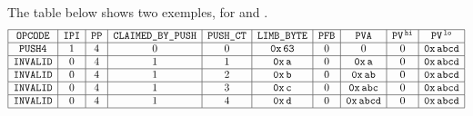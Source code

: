 The table below shows two exemples, for  and .
\[
    \begin{array}{|c|c|c|c|c|c|c|c|c|c|}
        \hline
        \texttt{OPCODE}           & \texttt{IPI}{} & \texttt{PP}{} & \texttt{CLAIMED\_BY\_PUSH}{} & \texttt{PUSH\_CT}{} & \texttt{LIMB\_BYTE}{} & \texttt{PFB}{} & \texttt{PVA}              & \texttt{PV}^{\mathtt{\,hi}}{} & \texttt{PV}^{\mathtt{\,lo}}{}         \\ \hline
        \texttt{PUSH4}   & 1     & 4     & 0      & 0     & \mathtt{0x\,63}      & 0      & 0                 & 0          & \mathtt{0x\,abcd} \\ \hline
        \texttt{INVALID} & 0     & 4     & 1      & 1     & \mathtt{0x\,a}       & 0      & \mathtt{0x\,a}    & 0          & \mathtt{0x\,abcd} \\ \hline
        \texttt{INVALID} & 0     & 4     & 1      & 2     & \mathtt{0x\,b}       & 0      & \mathtt{0x\,ab}   & 0          & \mathtt{0x\,abcd} \\ \hline
        \texttt{INVALID} & 0     & 4     & 1      & 3     & \mathtt{0x\,c}       & 0      & \mathtt{0x\,abc}  & 0          & \mathtt{0x\,abcd} \\ \hline
        \texttt{INVALID} & 0     & 4     & 1      & 4     & \mathtt{0x\,d}       & 0      & \mathtt{0x\,abcd} & 0          & \mathtt{0x\,abcd} \\ \hline
    \end{array}
\]


